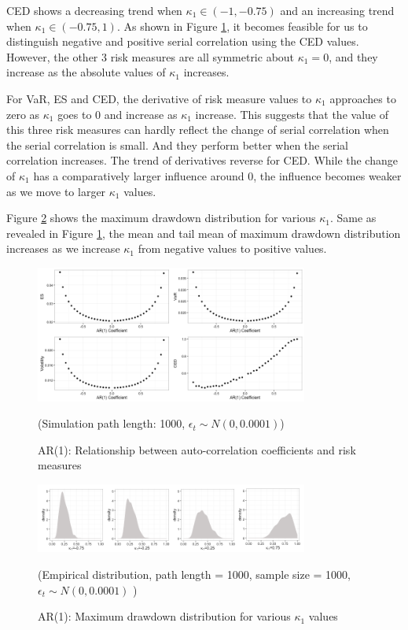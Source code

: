 \documentclass[11pt]{article}
\begin{document}
CED shows a decreasing trend when $\kappa_1\in(-1, -0.75)$ and an increasing trend when $\kappa_1 \in(-0.75, 1)$. As shown in Figure \ref{fig:AR1_risk_measures}, it becomes feasible for us to distinguish negative and positive serial correlation using the CED values. However, the other 3 risk measures are all symmetric about $\kappa_1 = 0$, and they increase as the absolute values of $\kappa_1$ increases.

For VaR, ES and CED, the derivative of risk measure values to $\kappa_1$ approaches to zero as  $\kappa_1$ goes to 0 and increase as $\kappa_1$ increase. This suggests that the value of this three risk measures can hardly reflect the change of serial correlation when the serial correlation is small. And they perform better when the serial correlation increases. The trend of derivatives reverse for CED. While the change of $\kappa_1$ has a comparatively larger influence around 0, the influence becomes weaker as we move to larger  $\kappa_1$ values.

Figure \ref{fig:AR1_maxDrawdown_dist} shows the maximum drawdown distribution for various $\kappa_1$. Same as revealed in Figure \ref{fig:AR1_risk_measures}, the mean and tail mean of maximum drawdown distribution increases as we increase $\kappa_1$ from negative values to positive values.

\begin{figure}[H]
\centering
\includegraphics[width = 0.8\textwidth]{../figures/simulation/AR1_risk_measures}
\caption{AR(1): Relationship between auto-correlation coefficients and risk measures}
(Simulation path length: 1000, $\epsilon_t \sim N(0, 0.0001)$)
\label{fig:AR1_risk_measures}
\end{figure}

\begin{figure}[H]
\centering
\includegraphics[width = 0.8\textwidth]{../figures/simulation/AR1_maxDrawdown_dist_re}
\caption{AR(1): Maximum drawdown distribution for various $\kappa_1$ values }
(Empirical distribution, path length = 1000, sample size = 1000, $\epsilon_t \sim N(0, 0.0001)$ )
\label{fig:AR1_maxDrawdown_dist}
\end{figure}
\end{document}
